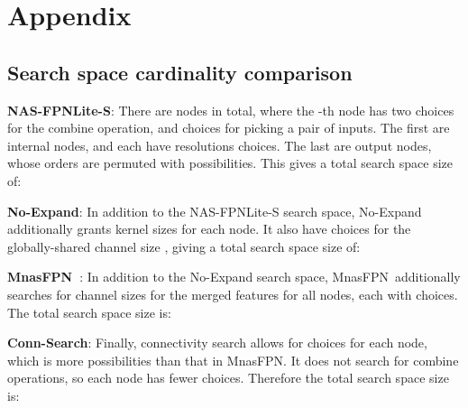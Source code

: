 \documentclass[10pt,twocolumn,letterpaper]{article}
\def\Mnasfpn{MnasFPN~}
\def\Mnasfpnnospace{MnasFPN}
\begin{document}
 
{\small


}
\appendix

\section{Appendix}
\subsection{Search space cardinality comparison}
\label{sec:search_space_size}
{\bf NAS-FPNLite-S}: There are  nodes in total, where the -th node has two choices for the combine operation, and  choices for picking a pair of inputs. The first  are internal nodes, and each have  resolutions choices. The last  are output nodes, whose orders are permuted with  possibilities. This gives a total search space size of:


{\bf No-Expand}: In addition to the NAS-FPNLite-S search space, No-Expand additionally grants  kernel sizes for each node. It also have  choices for the globally-shared channel size , giving a total search space size of:


{\bf \Mnasfpn}: In addition to the No-Expand search space, \Mnasfpn additionally searches for channel sizes for the merged features for all  nodes, each with  choices. The total search space size is:


{\bf Conn-Search}: Finally, connectivity search allows for  choices for each node, which is  more possibilities than that in \Mnasfpnnospace. It does not search for combine operations, so each node has  fewer choices. Therefore the total search space size is:


 
\cleardoublepage
\end{document}
